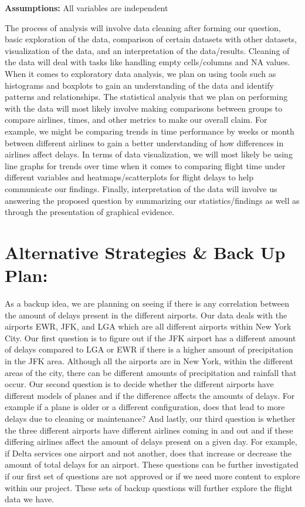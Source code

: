 \documentclass[
  10pt,
  letterpaper,
  DIV=11,
  numbers=noendperiod]{scrartcl}
\begin{document}
\textbf{Assumptions:} All variables are independent

The process of analysis will involve data cleaning after forming our
question, basic exploration of the data, comparison of certain datasets
with other datasets, visualization of the data, and an interpretation of
the data/results. Cleaning of the data will deal with tasks like
handling empty cells/columns and NA values. When it comes to exploratory
data analysis, we plan on using tools such as histograms and boxplots to
gain an understanding of the data and identify patterns and
relationships. The statistical analysis that we plan on performing with
the data will most likely involve making comparisons between groups to
compare airlines, times, and other metrics to make our overall claim.
For example, we might be comparing trends in time performance by weeks
or month between different airlines to gain a better understanding of
how differences in airlines affect delays. In terms of data
visualization, we will most likely be using line graphs for trends over
time when it comes to comparing flight time under different variables
and heatmaps/scatterplots for flight delays to help communicate our
findings. Finally, interpretation of the data will involve us answering
the proposed question by summarizing our statistics/findings as well as
through the presentation of graphical evidence.

\section{Alternative Strategies \& Back Up
Plan:}\label{alternative-strategies-back-up-plan}

As a backup idea, we are planning on seeing if there is any correlation
between the amount of delays present in the different airports. Our data
deals with the airports EWR, JFK, and LGA which are all different
airports within New York City. Our first question is to figure out if
the JFK airport has a different amount of delays compared to LGA or EWR
if there is a higher amount of precipitation in the JFK area. Although
all the airports are in New York, within the different areas of the
city, there can be different amounts of precipitation and rainfall that
occur. Our second question is to decide whether the different airports
have different models of planes and if the difference affects the
amounts of delays. For example if a plane is older or a different
configuration, does that lead to more delays due to cleaning or
maintenance? And lastly, our third question is whether the three
different airports have different airlines coming in and out and if
these differing airlines affect the amount of delays present on a given
day. For example, if Delta services one airport and not another, does
that increase or decrease the amount of total delays for an airport.
These questions can be further investigated if our first set of
questions are not approved or if we need more content to explore within
our project. These sets of backup questions will further explore the
flight data we have.
\end{document}
